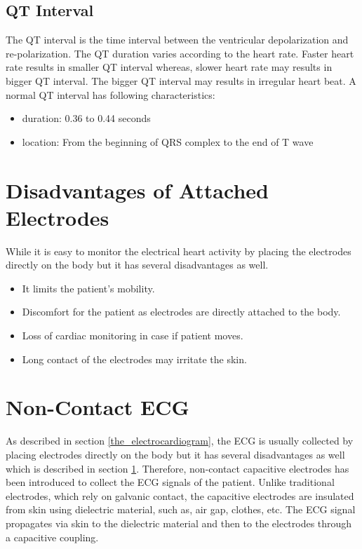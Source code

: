 \subsection{QT Interval}
The QT interval is the time interval between the ventricular depolarization and re-polarization. The QT duration varies according to the heart rate. Faster heart rate results in smaller QT interval whereas, slower heart rate may results in bigger QT interval. The bigger QT interval may results in irregular heart beat. A normal QT interval has following characteristics:

\begin{itemize}
	\item duration: 0.36 to 0.44 seconds
	\item location: From the beginning of QRS complex to the end of T wave
\end{itemize}

\section{Disadvantages of Attached Electrodes} \label{electrodes_disadv}

While it is easy to monitor the electrical heart activity by placing the electrodes directly on the body but it has several disadvantages as well.

\begin{itemize}
	\item It limits the patient's mobility.
	\item Discomfort for the patient as electrodes are directly attached to the body.
	\item Loss of cardiac monitoring in case if patient moves.
	\item Long contact of the electrodes may irritate the skin.
\end{itemize}

\section{Non-Contact ECG}
As described in section \ref{the_electrocardiogram}, the ECG is usually collected by placing electrodes directly on the body but it has several disadvantages as well which is described in section \ref{electrodes_disadv}. Therefore, non-contact capacitive electrodes has been introduced to collect the ECG signals of the patient. Unlike traditional electrodes, which rely on galvanic contact, the capacitive electrodes are insulated from skin using dielectric material, such as, air gap, clothes, etc. The ECG signal propagates via skin to the dielectric material and then to the electrodes through a capacitive coupling.

